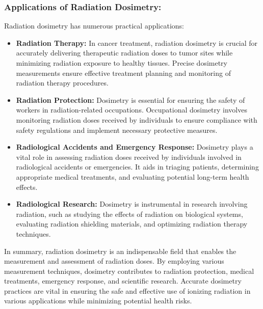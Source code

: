 \documentclass[../../Report.tex]{subfiles}
\begin{document}
    \subsubsection*{\large Applications of Radiation Dosimetry:}
        Radiation dosimetry has numerous practical applications:
        \begin{itemize}
            \item \textbf{Radiation Therapy: } In cancer treatment, radiation dosimetry is crucial for accurately 
            delivering therapeutic radiation doses to tumor sites while minimizing radiation exposure to healthy 
            tissues. Precise dosimetry measurements ensure effective treatment planning and monitoring of radiation 
            therapy procedures.

            \item \textbf{Radiation Protection: } Dosimetry is essential for ensuring the safety of workers in 
            radiation-related occupations. Occupational dosimetry involves monitoring radiation doses received by 
            individuals to ensure compliance with safety regulations and implement necessary protective measures.

            \item \textbf{Radiological Accidents and Emergency Response: } Dosimetry plays a vital role in assessing 
            radiation doses received by individuals involved in radiological accidents or emergencies. It aids in 
            triaging patients, determining appropriate medical treatments, and evaluating potential long-term health 
            effects.

            \item \textbf{Radiological Research: } Dosimetry is instrumental in research involving radiation, such as 
            studying the effects of radiation on biological systems, evaluating radiation shielding materials, and 
            optimizing radiation therapy techniques.

        \end{itemize}
    
        In summary, radiation dosimetry is an indispensable field that enables the measurement and assessment of 
        radiation doses. By employing various measurement techniques, dosimetry contributes to radiation protection, 
        medical treatments, emergency response, and scientific research. Accurate dosimetry practices are vital in 
        ensuring the safe and effective use of ionizing radiation in various applications while minimizing potential 
        health risks.
\end{document}
